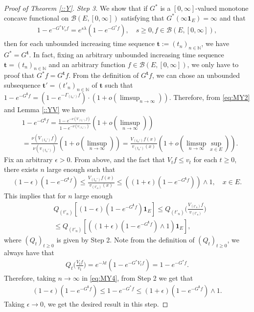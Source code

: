 \documentclass[12pt,a4paper]{amsart}
\numberwithin{equation}{section}
\theoremstyle{plain}
\theoremstyle{definition}
\theoremstyle{remark}
\begin{document}
\begin{proof}[Proof of Theorem \ref{::Y}]
\emph{Step 3.} 
  We show that if $G^*$ is a $[0,\infty]$-valued monotone concave functional on $\mathcal B(E,[0,\infty])$ satisfying that $G^*(\infty \mathbf 1_E) = \infty$ and that 
  \begin{align}
    1 - e^{- G^* V_sf} = e^{s\lambda} (1- e^{- G^* f}),
    \quad s \geq 0, f \in \mathcal B(E, [0,\infty]),
  \end{align}
  then for each unbounded increasing time sequence $\mathbf t:= (t_n)_{n\in \mathbb N}$, we have $G^* = G^{\mathbf t}$.
  In fact, fixing an arbitrary unbounded increasing time sequence $\mathbf t=(t_n)_{n\in \mathbb N}$ and an arbitrary function $f\in \mathcal B(E,[0,\infty])$, we only have to proof that $G^* f = G^{\mathbf t}f$.
From the definition of $G^{\mathbf t}f$, we can chose an unbounded subsequence $\mathbf t'=(t'_n)_{n \in \mathbb N}$ of $\mathbf t$ such that $ 1 - e^{- G^{\mathbf t}f} =  ( 1 - e^{-\Gamma_{( t_n')} f} ) \cdot (1+ o(\limsup_{n\to \infty})). $
Therefore, from \eqref{eq:MY2} and  Lemma \ref{::YV} we have
\begin{align}
  & 1 - e^{- G^{\mathbf t}f}
  = \frac{1 - e^{- \nu( V_{(t_n')}f)}}{1- e^{- \nu(v_{(t_n')})}}  (1+o(\limsup_{n\to \infty})) \\
  & = \frac{\nu (V_{(t_n')} f)}{\nu(v_{(t_n')})}(1+o(\limsup_{n\to \infty})) 
  =  \frac{V_{(t_n')}f(x)}{v_{(t_n')}(x)} ( 1 + o(\limsup_{n \to \infty} \sup_{x\in E})).
\end{align}
Fix an arbitrary $\epsilon > 0$. 
From above, and the fact that $V_tf \leq v_t$ for each $t\geq 0$, there exists $n$ large enough such that
\begin{align}
  (1-\epsilon) (1 - e^{- G^{\mathbf t}f} )
  \leq \frac{V_{(t_n')}f(x)}{v_{(t'_n)}(x)}
  \leq ((1+\epsilon) ( 1 - e^{- G^{\mathbf t}f} )) \wedge 1,
  \quad x\in E.
\end{align}
This implies that for $n$ large enough 
\begin{align}
  \label{eq:MY4}
  & Q_{(t'_n)}[ (1-\epsilon) (1-e^{-G^{\mathbf t}f})\mathbf 1_E ]
    \leq Q_{(t'_n)}\Big( \frac{V_{(t'_n)}f}{v_{(t'_n)}} \Big) 
  \\ &  \leq Q_{(t'_n)}[ ( (1+\epsilon) (1-e^{-G^{\mathbf t}f}) \wedge 1) \mathbf 1_E ],
\end{align}
where $(Q_t)_{t\geq 0}$ is given by Step 2.
Note from the definition of $(Q_t)_{t\geq 0}$, we always have that
\begin{align}
	Q_t \Big( \frac{V_tf}{v_t}  \Big) 
  = e^{- \lambda t}( 1 - e^{- G^*V_tf}  )
  = 1- e^{- G^* f}.
\end{align}	
Therefore, taking $n \to \infty$ in \eqref{eq:MY4}, from Step 2 we get that
\begin{align}
	(1 - \epsilon) (1 - e^{- G^{\mathbf t}f})
  \leq 1 - e^{- G^* f} 
  \leq (1 + \epsilon) (1 - e^{- G^{\mathbf t} f})\wedge 1.
\end{align}
Taking $\epsilon \to 0$, we get the desired result in this step.


\end{proof}
\end{document}
